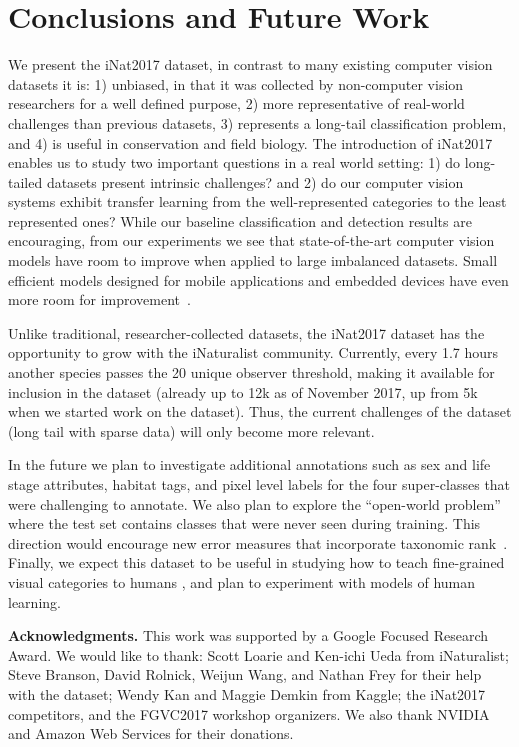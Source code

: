 \documentclass[10pt,twocolumn,letterpaper]{article}
\begin{document}
\section{Conclusions and Future Work}
We present the iNat2017 dataset, in contrast to many existing computer vision datasets it is: 1) unbiased, in that it was collected by non-computer vision researchers for a well defined purpose, 2) more representative of real-world challenges than previous datasets, 3) represents a long-tail classification problem, and 4) is useful in conservation and field biology.
The introduction of iNat2017 enables us to study two important questions in a real world setting: 1) do long-tailed datasets present intrinsic challenges? and 2) do our computer vision systems exhibit transfer learning from the well-represented categories to the least represented ones?
While our baseline classification and detection results are encouraging, from our experiments we see that state-of-the-art computer vision models have room to improve when applied to large imbalanced datasets. Small efficient models designed for mobile applications and embedded devices have even more room for improvement~\cite{howard2017mobilenets}.

Unlike traditional, researcher-collected datasets, the iNat2017 dataset has the opportunity to grow with the iNaturalist community. Currently, every 1.7 hours another species passes the 20 unique observer threshold, making it available for inclusion in the dataset (already up to 12k as of November 2017, up from 5k when we started work on the dataset). Thus, the current challenges of the dataset (long tail with sparse data) will only become more relevant. 

In the future we plan to investigate additional annotations such as sex and life stage attributes, habitat tags, and pixel level labels for the four super-classes that were challenging to annotate. We also plan to explore the ``open-world problem'' where the test set contains classes that were never seen during training. This direction would encourage new error measures that incorporate taxonomic rank~\cite{mittal2012taxonomic, yan2015hd}. Finally, we expect this dataset to be useful in studying how to teach fine-grained visual categories to humans \cite{singla2014near, johns2015becoming}, and plan to experiment with models of human learning. 





\vspace{5pt}
\par\noindent\textbf{Acknowledgments.} 
This work was supported by a Google Focused Research Award. We would like to thank: Scott Loarie and Ken-ichi Ueda from iNaturalist; Steve Branson, David Rolnick, Weijun Wang, and Nathan Frey for their help with the dataset; Wendy Kan and Maggie Demkin from Kaggle; the iNat2017 competitors, and the FGVC2017 workshop organizers. We also thank NVIDIA and Amazon Web Services for their donations.





{\small


}
\end{document}
